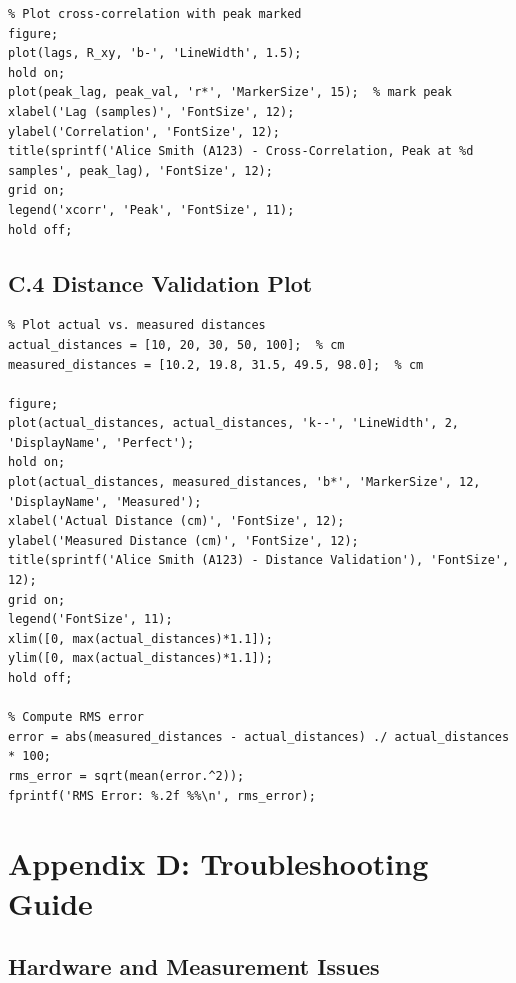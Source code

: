 \documentclass[11pt,letterpaper]{article}
\begin{document}
\begin{verbatim}
% Plot cross-correlation with peak marked
figure;
plot(lags, R_xy, 'b-', 'LineWidth', 1.5);
hold on;
plot(peak_lag, peak_val, 'r*', 'MarkerSize', 15);  % mark peak
xlabel('Lag (samples)', 'FontSize', 12);
ylabel('Correlation', 'FontSize', 12);
title(sprintf('Alice Smith (A123) - Cross-Correlation, Peak at %d samples', peak_lag), 'FontSize', 12);
grid on;
legend('xcorr', 'Peak', 'FontSize', 11);
hold off;
\end{verbatim}

\subsection*{C.4 Distance Validation Plot}

\begin{verbatim}
% Plot actual vs. measured distances
actual_distances = [10, 20, 30, 50, 100];  % cm
measured_distances = [10.2, 19.8, 31.5, 49.5, 98.0];  % cm

figure;
plot(actual_distances, actual_distances, 'k--', 'LineWidth', 2, 'DisplayName', 'Perfect');
hold on;
plot(actual_distances, measured_distances, 'b*', 'MarkerSize', 12, 'DisplayName', 'Measured');
xlabel('Actual Distance (cm)', 'FontSize', 12);
ylabel('Measured Distance (cm)', 'FontSize', 12);
title(sprintf('Alice Smith (A123) - Distance Validation'), 'FontSize', 12);
grid on;
legend('FontSize', 11);
xlim([0, max(actual_distances)*1.1]);
ylim([0, max(actual_distances)*1.1]);
hold off;

% Compute RMS error
error = abs(measured_distances - actual_distances) ./ actual_distances * 100;
rms_error = sqrt(mean(error.^2));
fprintf('RMS Error: %.2f %%\n', rms_error);
\end{verbatim}

\clearpage

\section*{Appendix D: Troubleshooting Guide}

\subsection*{Hardware and Measurement Issues}
\end{document}
